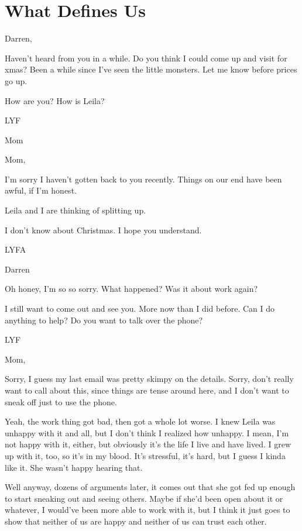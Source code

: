 \hypertarget{what-defines-us}{%
\chapter{What Defines Us}\label{what-defines-us}}

Darren,

Haven't heard from you in a while. Do you think I could come up and visit for xmas? Been a while since I've seen the little monsters. Let me know before prices go up.

How are you? How is Leila?

LYF

Mom

\secdiv{}

Mom,

I'm sorry I haven't gotten back to you recently. Things on our end have been awful, if I'm honest.

Leila and I are thinking of splitting up.

I don't know about Christmas. I hope you understand.

LYFA

Darren

\secdiv{}\newpage

Oh honey, I'm so so sorry. What happened? Was it about work again?

I still want to come out and see you. More now than I did before. Can I do anything to help? Do you want to talk over the phone?

LYF

\secdiv{}

Mom,

Sorry, I guess my last email was pretty skimpy on the details. Sorry, don't really want to call about this, since things are tense around here, and I don't want to sneak off just to use the phone.

Yeah, the work thing got bad, then got a whole lot worse. I knew Leila was unhappy with it and all, but I don't think I realized how unhappy. I mean, I'm not happy with it, either, but obviously it's the life I live and have lived. I grew up with it, too, so it's in my blood. It's stressful, it's hard, but I guess I kinda like it. She wasn't happy hearing that.

Well anyway, dozens of arguments later, it comes out that she got fed up enough to start sneaking out and seeing others. Maybe if she'd been open about it or whatever, I would've been more able to work with it, but I think it just goes to show that neither of us are happy and neither of us can trust each other.

